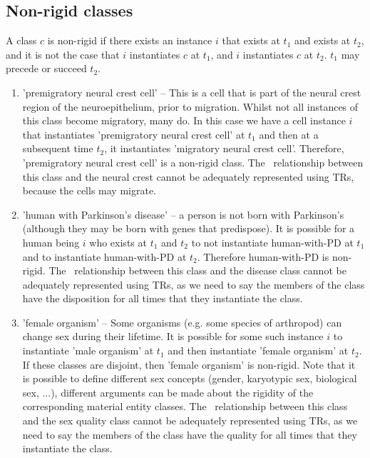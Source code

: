 \documentclass{bioinfo}
\def\partOf{\pr{part\_of}}
\begin{document}
\subsection{Non-rigid classes}

A class $c$ is non-rigid if there exists an instance $i$ that exists
at $t_1$ and exists at $t_2$, and it is not the case that $i$
instantiates $c$ at $t_1$, and $i$ instantiates $c$ at $t_2$. $t_1$
may precede or succeed $t_2$.

\begin{enumerate}

\item 'premigratory neural crest cell' -- This is a cell that is part
  of the neural crest region of the neuroepithelium, prior to
  migration. Whilst not all instances of this class become migratory,
  many do. In this case we have a cell instance $i$ that instantiates
  'premigratory neural crest cell' at $t_1$ and then at a subsequent
  time $t_2$, it instantiates 'migratory neural crest
  cell'. Therefore, 'premigratory neural crest cell' is a non-rigid
  class. The \partOf\ relationship between this class and the neural
  crest cannot be adequately represented using TRs, because the cells
  may migrate.

\item 'human with Parkinson's disease' -- a person is not born with
  Parkinson's (although they may be born with genes that
  predispose). It is possible for a human being $i$ who exists at
  $t_1$ and $t_2$ to not instantiate human-with-PD at $t_1$ and to
  instantiate human-with-PD at $t_2$. Therefore human-with-PD is
  non-rigid. The \ relationship between this class
  and the disease class cannot be adequately represented using TRs, as
  we need to say the members of the class have the disposition for all
  times that they instantiate the class.

\item 'female organism' -- Some organisms (e.g. some species of
  arthropod) can change sex during their lifetime. It is possible for
  some such instance $i$ to instantiate 'male organism' at $t_1$ and
  then instantiate 'female organism' at $t_2$. If these classes are
  disjoint, then 'female organism' is non-rigid. Note that it is
  possible to define different sex concepts (gender, karyotypic sex,
  biological sex, ...), different arguments can be made about the
  rigidity of the corresponding material entity classes.  The
  \ relationship between this class and the sex
  quality class cannot be adequately represented using TRs, as we need
  to say the members of the class have the quality for all times
  that they instantiate the class.



\end{enumerate}
\end{document}
